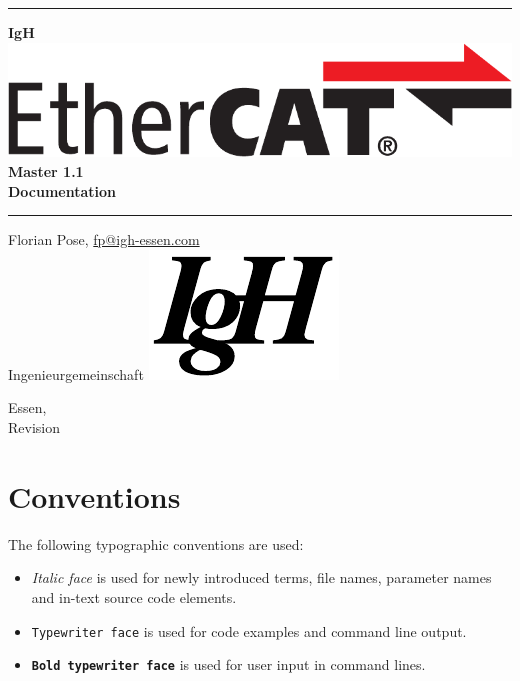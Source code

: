 \documentclass[a4paper,12pt,BCOR6mm,bibtotoc,idxtotoc]{scrbook}
\newcommand{\IgH}{\raisebox{-0.7667ex}
  {\includegraphics[height=2.2ex]{images/ighsign}}}
\begin{document}
\pagestyle{empty}

\begin{titlepage}
  \begin{center}
    \rule{\textwidth}{1.5mm}

    {\Huge\bf IgH \includegraphics[height=2.4ex]{images/ethercat}
      Master 1.1\\[1ex]
      Documentation}

    \vspace{1ex}
    \rule{\textwidth}{1.5mm}

    \vspace{\fill}
    {\Large Florian Pose, \url{fp@igh-essen.com}\\[1ex]
      Ingenieurgemeinschaft \IgH}

    \vspace{\fill}
    {\Large Essen, \SVNDate\\[1ex]
      Revision \SVNRevision}
  \end{center}
\end{titlepage}


\tableofcontents
\listoftables
\listoffigures
\lstlistoflistings


\newpage
\pagestyle{scrheadings}

\section*{Conventions}

The following typographic conventions are used:

\begin{itemize}
\item \textit{Italic face} is used for newly introduced terms, file
  names, parameter names and in-text source code elements.
\item \texttt{Typewriter face} is used for code examples and
  command line output.
\item \texttt{\textbf{Bold typewriter face}} is used for user input in
  command lines.
\end{itemize}
\end{document}
